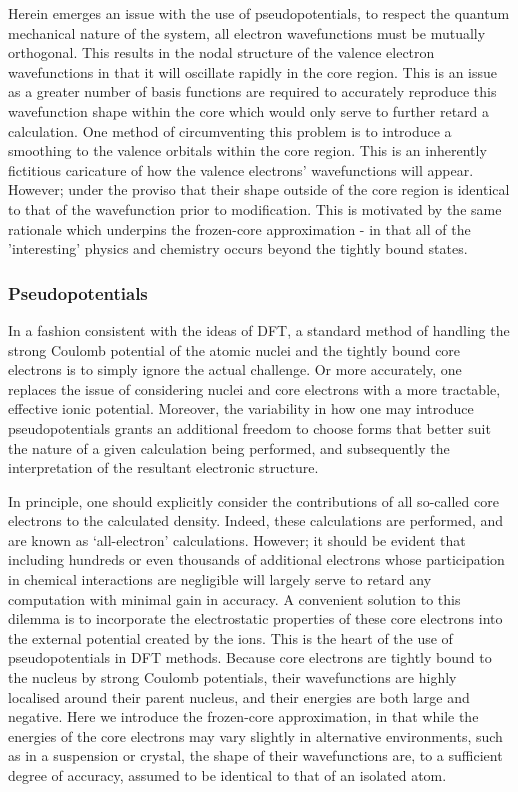 Herein emerges an issue with the use of pseudopotentials, to respect the quantum mechanical nature of the system, all electron wavefunctions must be mutually orthogonal. This results in the nodal structure of the valence electron wavefunctions in that it will oscillate rapidly in the core region. This is an issue as a greater number of basis functions are required to accurately reproduce this wavefunction shape within the core which would only serve to further retard a calculation. One method of circumventing this problem is to introduce a smoothing to the valence orbitals within the core region. This is an inherently fictitious caricature of how the valence electrons' wavefunctions will appear. However; under the proviso that their shape outside of the core region is identical to that of the wavefunction prior to modification. This is motivated by the same rationale which underpins the frozen-core approximation - in that all of the 'interesting' physics and chemistry occurs beyond the tightly bound states. 


\subsubsection{Pseudopotentials}
\label{sec:Ps}
In a fashion consistent with the ideas of DFT, a standard method of handling the strong Coulomb potential of the atomic nuclei and the tightly bound core electrons is to simply ignore the actual challenge. Or more accurately, one replaces the issue of considering nuclei and core electrons with a more tractable, effective ionic potential. Moreover, the variability in how one may introduce pseudopotentials grants an additional freedom to choose forms that better suit the nature of a given calculation being performed, and subsequently the interpretation of the resultant electronic structure.

In principle, one should explicitly consider the contributions of all so-called core electrons to the calculated density. Indeed, these calculations are performed, and are known as `all-electron' calculations. However; it should be evident that including hundreds or even thousands of additional electrons whose participation in chemical interactions are negligible will largely serve to retard any computation with minimal gain in accuracy. A convenient solution to this dilemma is to incorporate the electrostatic properties of these core electrons into the external potential created by the ions. This is the heart of the use of pseudopotentials in DFT methods. Because core electrons are tightly bound to the nucleus by strong Coulomb potentials, their wavefunctions are highly localised around their parent nucleus, and their energies are both large and negative. Here we introduce the frozen-core approximation, in that while the energies of the core electrons may vary slightly in alternative environments, such as in a  suspension or crystal, the shape of their wavefunctions are, to a sufficient degree of accuracy, assumed to be identical to that of an isolated atom. 

